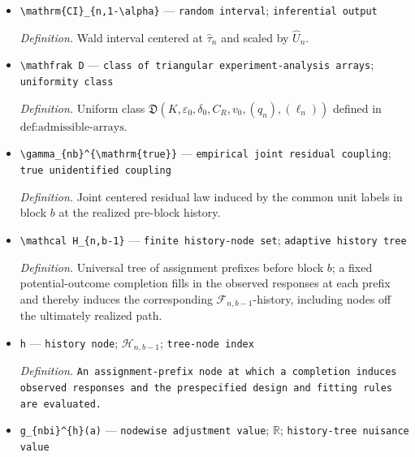 \documentclass{article}
\begin{document}
\begin{itemize}
  \par\smallskip\noindent\emph{Definition.} The \((1-\alpha/2)\)-quantile of \(\mathcal N(0,1)\).
  \item \texttt{\textbackslash{}\allowbreak{}mathrm\{CI\}\allowbreak{}\_\allowbreak{}\{n,\allowbreak{}1-\allowbreak{}\textbackslash{}\allowbreak{}alpha\}\allowbreak{}} --- \texttt{random interval}; \texttt{inferential output}
  \par\smallskip\noindent\emph{Definition.} Wald interval centered at \(\widehat\tau_n\) and scaled by \(\widehat U_n\).
  \item \texttt{\textbackslash{}\allowbreak{}mathfrak D} --- \texttt{class of triangular experiment-\allowbreak{}analysis arrays}; \texttt{uniformity class}
  \par\smallskip\noindent\emph{Definition.} Uniform class \(\mathfrak D(K,\varepsilon_0,\delta_0,C_R,v_0,(q_n),(\ell_n))\) defined in \(\text{def:admissible-arrays}\).
  \item \texttt{\textbackslash{}\allowbreak{}gamma\_\allowbreak{}\{nb\}\allowbreak{}\textasciicircum{}\{\textbackslash{}\allowbreak{}mathrm\{true\}\allowbreak{}\}\allowbreak{}} --- \texttt{empirical joint residual coupling}; \texttt{true unidentified coupling}
  \par\smallskip\noindent\emph{Definition.} Joint centered residual law induced by the common unit labels in block \(b\) at the realized pre-block history.
  \item \texttt{\textbackslash{}\allowbreak{}mathcal H\_\allowbreak{}\{n,\allowbreak{}b-\allowbreak{}1\}\allowbreak{}} --- \texttt{finite history-\allowbreak{}node set}; \texttt{adaptive history tree}
  \par\smallskip\noindent\emph{Definition.} Universal tree of assignment prefixes before block \(b\); a fixed potential-outcome completion fills in the observed responses at each prefix and thereby induces the corresponding \(\mathcal F_{n,b-1}\)-history, including nodes off the ultimately realized path.
  \item \texttt{h} --- \texttt{history node}; \(\mathcal H_{n,b-1}\); \texttt{tree-\allowbreak{}node index}
  \par\smallskip\noindent\emph{Definition.} \texttt{An assignment-\allowbreak{}prefix node at which a completion induces observed responses and the prespecified design and fitting rules are evaluated.}
  \item \texttt{g\_\allowbreak{}\{nbi\}\allowbreak{}\textasciicircum{}\{h\}\allowbreak{}(a)} --- \texttt{nodewise adjustment value}; \(\mathbb R\); \texttt{history-\allowbreak{}tree nuisance value}

\end{itemize}
\end{document}
